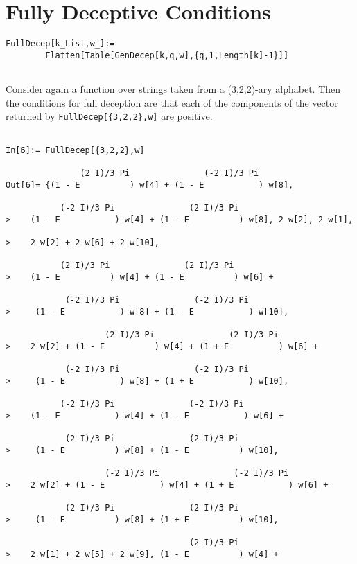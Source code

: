 \section{Fully Deceptive Conditions}
\begin{verbatim}
FullDecep[k_List,w_]:=
        Flatten[Table[GenDecep[k,q,w],{q,1,Length[k]-1}]]


\end{verbatim}
\begin{example}
Consider again a function over strings taken from a (3,2,2)-ary alphabet.
Then the conditions for full deception are that each of the components
of the vector returned by {\tt FullDecep[\{3,2,2\},w]} are positive.
\end{example}
\begin{verbatim}

In[6]:= FullDecep[{3,2,2},w]

               (2 I)/3 Pi               (-2 I)/3 Pi
Out[6]= {(1 - E          ) w[4] + (1 - E           ) w[8], 
 
           (-2 I)/3 Pi               (2 I)/3 Pi
>    (1 - E           ) w[4] + (1 - E          ) w[8], 2 w[2], 2 w[1], 
 
>    2 w[2] + 2 w[6] + 2 w[10], 
 
           (2 I)/3 Pi               (2 I)/3 Pi
>    (1 - E          ) w[4] + (1 - E          ) w[6] + 
 
            (-2 I)/3 Pi               (-2 I)/3 Pi
>     (1 - E           ) w[8] + (1 - E           ) w[10], 
 
                    (2 I)/3 Pi               (2 I)/3 Pi
>    2 w[2] + (1 - E          ) w[4] + (1 + E          ) w[6] + 
 
            (-2 I)/3 Pi               (-2 I)/3 Pi
>     (1 - E           ) w[8] + (1 + E           ) w[10], 
 
           (-2 I)/3 Pi               (-2 I)/3 Pi
>    (1 - E           ) w[4] + (1 - E           ) w[6] + 
 
            (2 I)/3 Pi               (2 I)/3 Pi
>     (1 - E          ) w[8] + (1 - E          ) w[10], 
 
                    (-2 I)/3 Pi               (-2 I)/3 Pi
>    2 w[2] + (1 - E           ) w[4] + (1 + E           ) w[6] + 
 
            (2 I)/3 Pi               (2 I)/3 Pi
>     (1 - E          ) w[8] + (1 + E          ) w[10], 
 
                                     (2 I)/3 Pi
>    2 w[1] + 2 w[5] + 2 w[9], (1 - E          ) w[4] + 
 

\end{verbatim}
